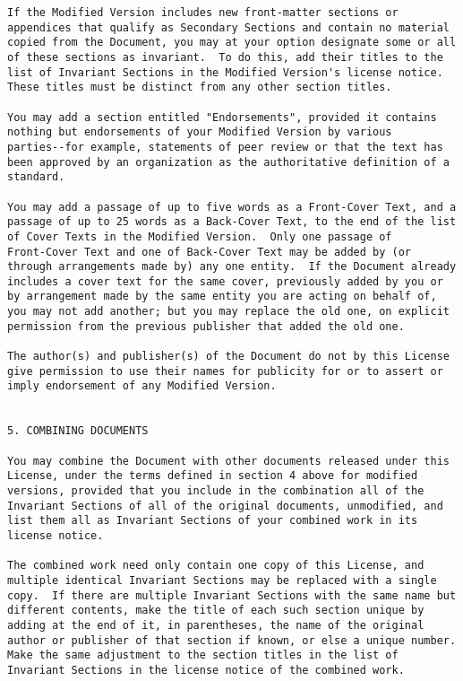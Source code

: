 \documentclass{report}
\begin{document}
\begin{verbatim}
If the Modified Version includes new front-matter sections or
appendices that qualify as Secondary Sections and contain no material
copied from the Document, you may at your option designate some or all
of these sections as invariant.  To do this, add their titles to the
list of Invariant Sections in the Modified Version's license notice.
These titles must be distinct from any other section titles.

You may add a section entitled "Endorsements", provided it contains
nothing but endorsements of your Modified Version by various
parties--for example, statements of peer review or that the text has
been approved by an organization as the authoritative definition of a
standard.

You may add a passage of up to five words as a Front-Cover Text, and a
passage of up to 25 words as a Back-Cover Text, to the end of the list
of Cover Texts in the Modified Version.  Only one passage of
Front-Cover Text and one of Back-Cover Text may be added by (or
through arrangements made by) any one entity.  If the Document already
includes a cover text for the same cover, previously added by you or
by arrangement made by the same entity you are acting on behalf of,
you may not add another; but you may replace the old one, on explicit
permission from the previous publisher that added the old one.

The author(s) and publisher(s) of the Document do not by this License
give permission to use their names for publicity for or to assert or
imply endorsement of any Modified Version.


5. COMBINING DOCUMENTS

You may combine the Document with other documents released under this
License, under the terms defined in section 4 above for modified
versions, provided that you include in the combination all of the
Invariant Sections of all of the original documents, unmodified, and
list them all as Invariant Sections of your combined work in its
license notice.

The combined work need only contain one copy of this License, and
multiple identical Invariant Sections may be replaced with a single
copy.  If there are multiple Invariant Sections with the same name but
different contents, make the title of each such section unique by
adding at the end of it, in parentheses, the name of the original
author or publisher of that section if known, or else a unique number.
Make the same adjustment to the section titles in the list of
Invariant Sections in the license notice of the combined work.


\end{verbatim}
\end{document}
